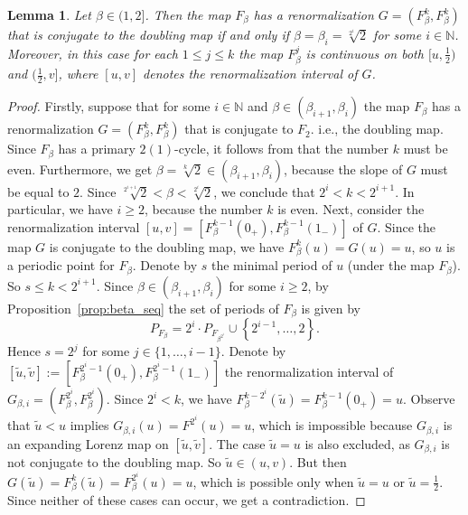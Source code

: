 \documentclass[10pt,reqno]{amsart}
\theoremstyle{plain}
\theoremstyle{assumption}
\theoremstyle{notation}
\theoremstyle{claim}
\theoremstyle{conj}
\theoremstyle{theorem}
\theoremstyle{proposition}
\theoremstyle{corollary}
\newtheorem{lemma}{Lemma}[section]
\begin{document}
\begin{lemma}\label{lem:doubling_conjugate}
Let $\beta\in(1,2]$. Then the map $F_\beta$ has a renormalization $G=(F^k_\beta,F^k_\beta)$ that is conjugate to the doubling map if and only if $\beta=\beta_i=\sqrt[2^i]{2}$ for some $i\in\mathbb{N}$. Moreover, in this case for each $1\leq j\leq k$ the map $F^j_\beta$ is continuous on both $[u,\frac{1}{2})$ and $(\frac{1}{2},v]$, where $[u,v]$ denotes the renormalization interval of $G$.
\end{lemma}
\begin{proof}
    Firstly, suppose that for some $i\in\mathbb{N}$ and $\beta\in(\beta_{i+1},\beta_i)$ the map $F_{\beta}$ has a renormalization $G=(F^k_\beta,F^k_\beta)$ that is conjugate to $F_2$. i.e., the doubling map. Since $F_{\beta}$ has a primary $2(1)$-cycle, it follows from \cite[Theorem~3.5(2)]{ChO} that the number $k$ must be even. Furthermore, we get $\beta=\sqrt[k]{2}\in(\beta_{i+1},\beta_i)$, because the slope of $G$ must be equal to $2$. Since $\sqrt[2^{i+1}]{2}<\beta<\sqrt[2^{i}]{2}$, we conclude that $2^i<k<2^{i+1}$. In particular, we have $i\geq2$, because the number $k$ is even. Next, consider the renormalization interval $[u,v]=[F^{k-1}_{\beta}(0_+),F^{k-1}_{\beta}(1_-)]$ of $G$. Since the map $G$ is conjugate to the doubling map, we have $F^k_{\beta}(u)=G(u)=u$, so $u$ is a periodic point for $F_{\beta}$. Denote by $s$ the minimal period of $u$ (under the map $F_{\beta}$). So $s\leq k<2^{i+1}$. Since $\beta\in(\beta_{i+1},\beta_i)$ for some $i\geq2$, by Proposition~\ref{prop:beta_seq} the set of periods of $F_{\beta}$ is given by
    $$
    P_{F_{\beta}}=
	2^{i}\cdot P_{F_{\beta^{2^i}}}\cup\left\lbrace2^{i-1},\ldots,2\right\rbrace.
    $$
    Hence $s=2^j$ for some $j\in\{1,\ldots,i-1\}$. Denote by $[\widetilde{u},\widetilde{v}]:=[F^{2^i-1}_{\beta}(0_+),F^{2^i-1}_{\beta}(1_-)]$ the renormalization interval of $G_{\beta,i}=(F^{2^i}_{\beta},F^{2^i}_{\beta})$. Since $2^i<k$, we have $F^{k-2^i}_{\beta}(\widetilde{u})=F^{k-1}_{\beta}(0_+)=u$. Observe that $\widetilde{u}<u$ implies $G_{\beta,i}(u)=F^{2^i}(u)=u$, which is impossible because $G_{\beta,i}$ is an expanding Lorenz map on $[\widetilde{u},\widetilde{v}]$. The case $\widetilde{u}=u$ is also excluded, as $G_{\beta,i}$ is not conjugate to the doubling map. So $\widetilde{u}\in(u,v)$. But then $G(\widetilde{u})=F^k_{\beta}(\widetilde{u})=F_{\beta}^{2^i}(u)=u$, which is possible only when $\widetilde{u}=u$ or $\widetilde{u}=\frac{1}{2}$. Since neither of these cases can occur, we get a contradiction.


\end{proof}
\end{document}
